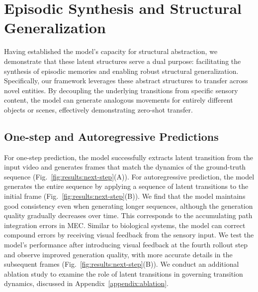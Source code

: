\begin{table}[htbp]
\centering
\caption{Sequence similarity of latent temporal differences.}
\label{tab:cosine_similarity}
\vspace{-0.4cm}
\end{table}

\section{Episodic Synthesis and Structural Generalization}
\label{sec:results}
Having established the model's capacity for structural abstraction, we demonstrate that these latent structures serve a dual purpose: facilitating the synthesis of episodic memories and enabling robust structural generalization. Specifically, our framework leverages these abstract structures to transfer across novel entities. By decoupling the underlying transitions from specific sensory content, the model can generate analogous movements for entirely different objects or scenes, effectively demonstrating zero-shot transfer.

\subsection{One-step and Autoregressive Predictions}
\label{sec:results:autoregressive}
For one-step prediction, the model successfully extracts latent transition from the input video and generates frames that match the dynamics of the ground-truth sequence (Fig.~\ref{fig:results:next-step}(A)). 
For autoregressive prediction, the model generates the entire sequence by applying a sequence of latent transitions to the initial frame (Fig.~\ref{fig:results:next-step}(B)). We find that the model maintains good consistency even when generating longer sequences, although the generation quality gradually decreases over time. This corresponds to the accumulating path integration errors in MEC.
Similar to biological systems, the model can correct compound errors by receiving visual feedback from the sensory input. We test the model's performance after introducing visual feedback at the fourth rollout step and observe improved generation quality, with more accurate details in the subsequent frames (Fig.~\ref{fig:results:next-step}(B)). We conduct an additional ablation study to examine the role of latent transitions in governing transition dynamics, discussed in Appendix~\ref{appendix:ablation}.
\vspace{-0.3cm}
